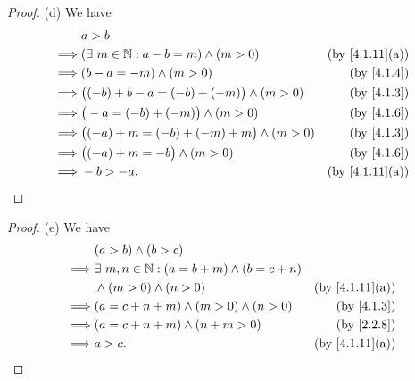 \begin{proof}{(d)}
  We have
  \begin{align*}
             & a > b                                                                             \\
    \implies & (\exists\ m \in \N : a - b = m) \land (m > 0)      & \text{(by \cref{4.1.11}(a))} \\
    \implies & (b - a = -m) \land (m > 0)                         & \text{(by \cref{4.1.4})}     \\
    \implies & \big((-b) + b - a = (-b) + (-m)\big) \land (m > 0) & \text{(by \cref{4.1.3})}     \\
    \implies & \big(-a = (-b) + (-m)\big) \land (m > 0)           & \text{(by \cref{4.1.6})}     \\
    \implies & \big((-a) + m = (-b) + (-m) + m\big) \land (m > 0) & \text{(by \cref{4.1.3})}     \\
    \implies & \big((-a) + m = -b\big) \land (m > 0)              & \text{(by \cref{4.1.6})}     \\
    \implies & -b > -a.                                           & \text{(by \cref{4.1.11}(a))}
  \end{align*}
\end{proof}

\begin{proof}{(e)}
  We have
  \begin{align*}
             & (a > b) \land (b > c)                                                               \\
    \implies & \exists\ m, n \in \N : (a = b + m) \land (b = c + n)                                \\
             & \land (m > 0) \land (n > 0)                          & \text{(by \cref{4.1.11}(a))} \\
    \implies & (a = c + n + m) \land (m > 0) \land (n > 0)          & \text{(by \cref{4.1.3})}     \\
    \implies & (a = c + n + m) \land (n + m > 0)                    & \text{(by \cref{2.2.8})}     \\
    \implies & a > c.                                               & \text{(by \cref{4.1.11}(a))}
  \end{align*}
\end{proof}

